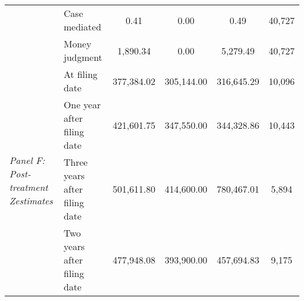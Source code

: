 \begin{tabular}{llcccc}
 & Case mediated & 0.41 & 0.00 & 0.49 & 40,727 \\
 & Money judgment & 1,890.34 & 0.00 & 5,279.49 & 40,727 \\
\cline{1-6}
\multirow[c]{4}{3cm}{\textit{Panel F: Post-treatment Zestimates}} & At filing date & 377,384.02 & 305,144.00 & 316,645.29 & 10,096 \\
 & One year after filing date & 421,601.75 & 347,550.00 & 344,328.86 & 10,443 \\
 & Three years after filing date & 501,611.80 & 414,600.00 & 780,467.01 & 5,894 \\
 & Two years after filing date & 477,948.08 & 393,900.00 & 457,694.83 & 9,175 \\
\cline{1-6}
\bottomrule
\end{tabular}
